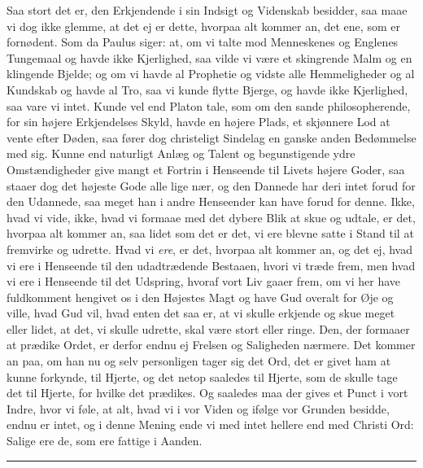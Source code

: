 \documentclass[12pt,a4paper]{book}
\newcommand{\apage}[1]{\marginnote{\footnotesize\textit{[#1]}}}
\begin{document}
\apage{203} Saa stort det er, den Erkjendende i sin Indsigt og Videnskab besidder, saa maae vi
dog ikke glemme, at det ej er dette, hvorpaa alt kommer an, det ene, som er
fornødent. Som da Paulus siger: at, om vi talte mod Menneskenes og Englenes
Tungemaal og havde ikke Kjerlighed, saa vilde vi være et skingrende Malm og en
klingende Bjelde; og om vi havde al Prophetie og vidste alle Hemmeligheder og al
Kundskab og havde al Tro, saa vi kunde flytte Bjerge, og havde ikke Kjerlighed, saa
vare vi intet. Kunde vel end Platon tale, som om den sande philosopherende, for sin
højere Erkjendelses Skyld, havde en højere Plads, et skjønnere Lod at vente efter
Døden, saa fører dog christeligt Sindelag en ganske anden Bedømmelse med sig. Kunne
end naturligt Anlæg og Talent og begunstigende ydre Omstændigheder give mangt et
Fortrin i Henseende til Livets højere Goder, saa staaer dog det højeste Gode alle
lige nær, og den Dannede har deri intet forud for den Udannede, saa meget han i
andre Henseender kan have forud for denne. Ikke, hvad vi vide, ikke, hvad vi
formaae med det dybere Blik at skue og udtale, er det, hvorpaa alt kommer an, saa
lidet som det er det, vi ere blevne satte i Stand til at fremvirke og udrette.
Hvad vi \emph{ere}, er det, hvorpaa alt kommer an, og det ej, hvad vi ere \apage{204} i Henseende til
den udadtrædende Bestaaen, hvori vi træde frem, men hvad vi ere i Henseende til det
Udspring, hvoraf vort Liv gaaer frem, om vi her have fuldkomment hengivet os i den
Højestes Magt og have Gud overalt for Øje og ville, hvad Gud vil, hvad enten det
saa er, at vi skulle erkjende og skue meget eller lidet, at det, vi skulle udrette,
skal være stort eller ringe. Den, der formaaer at prædike Ordet, er derfor endnu ej
Frelsen og Saligheden nærmere. Det kommer an paa, om han nu og selv personligen
tager sig det Ord, det er givet ham at kunne forkynde, til Hjerte, og det netop
saaledes til Hjerte, som de skulle tage det til Hjerte, for hvilke det prædikes. Og
saaledes maa der gives et Punct i vort Indre, hvor vi føle, at alt, hvad vi i vor
Viden og ifølge vor Grunden besidde, endnu er intet, og i denne Mening ende vi med
intet hellere end med Christi Ord: Salige ere de, som ere fattige i Aanden.

\begin{center}\rule{0.28\linewidth}{0.4pt}\end{center}
\end{document}
